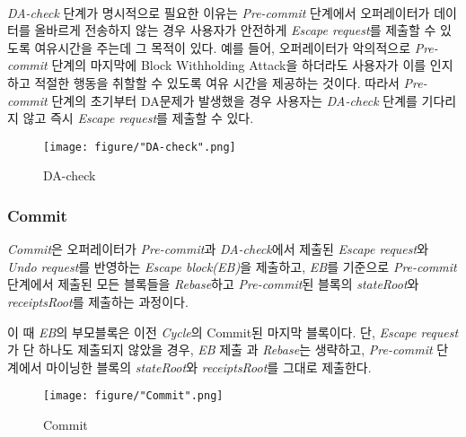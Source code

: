 \documentclass[letterpaper, 11pt]{article}
\begin{document}
\begin{CJK}{UTF8}{mj}
\paragraph{}
\emph{DA-check} 단계가 명시적으로 필요한 이유는 \emph{Pre-commit} 단계에서 오퍼레이터가 데이터를 올바르게 전송하지 않는 경우 사용자가 안전하게 \emph{Escape request}를 제출할 수 있도록 여유시간을 주는데 그 목적이 있다. 예를 들어, 오퍼레이터가 악의적으로 \emph{Pre-commit} 단계의 마지막에 Block Withholding Attack을 하더라도 사용자가 이를 인지하고 적절한 행동을 취할할 수 있도록 여유 시간을 제공하는 것이다. 따라서 \emph{Pre-commit} 단계의 초기부터 DA문제가 발생했을 경우 사용자는 \emph{DA-check} 단계를 기다리지 않고 즉시 \emph{Escape request}를 제출할 수 있다.

\begin{figure}[!h]
\centering
\texttt{[image: figure/"DA-check".png]}
\caption{DA-check}
\label{fig:da-check}
\end{figure}

\end{CJK}

\subsubsection{Commit}
\begin{CJK}{UTF8}{mj}
\emph{Commit}은 오퍼레이터가 \emph{Pre-commit}과 \emph{DA-check}에서 제출된 \emph{Escape request}와 \emph{Undo request}를 반영하는 \emph{Escape block(EB)}을 제출하고, \emph{EB}를 기준으로 \emph{Pre-commit}단계에서 제출된 모든 블록들을 \emph{Rebase}하고 \emph{Pre-commit}된 블록의 \emph{stateRoot}와 \emph{receiptsRoot}를 제출하는 과정이다.

이 때 \emph{EB}의 부모블록은 이전 \emph{Cycle}의 Commit된 마지막 블록이다. 단, \emph{Escape request}가 단 하나도 제출되지 않았을 경우, \emph{EB} 제출 과 \emph{Rebase}는 생략하고, \emph{Pre-commit} 단계에서 마이닝한 블록의 \emph{stateRoot}와 \emph{receiptsRoot}를 그대로 제출한다.

\begin{figure}[!h]
\centering
\texttt{[image: figure/"Commit".png]}
\caption{Commit}
\label{fig:commit-diagram}
\end{figure}

\end{CJK}
\end{document}
